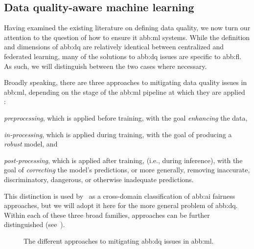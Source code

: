 \subsection{Data quality-aware machine learning}\label{sub:dq:solutions}

Having examined the existing literature on defining data quality,
we now turn our attention to the question of how to ensure it \gls{abb:ml} systems.
While the definition and dimensions of \gls{abb:dq}
are relatively identical between centralized and federated learning,
many of the solutions to \gls{abb:dq} issues are specific to \gls{abb:fl}.
As such, we will distinguish between the two cases where necessary.

Broadly speaking, there are three approaches to mitigating data quality issues in \gls{abb:ml},
depending on the stage of the \gls{abb:ml} pipeline at which they are applied~\cite{%
	mehrabiSurveyBiasFairness2022,%
	whangDataCollectionQuality2023%
}
:
\begin{enumerate*}[label=(\roman*)]
	\item \emph{preprocessing},
	      which is applied before training, with the goal \emph{enhancing} the data,
	\item \emph{in-processing},
	      which is applied during training,
	      with the goal of producing a \emph{robust} model, and
	\item \emph{post-processing},
	      which is applied after training, (i.e., during inference),
	      with the goal of \emph{correcting} the model's predictions, or more generally,
	      removing inaccurate, discriminatory, dangerous, or otherwise inadequate predictions.
\end{enumerate*}
This distinction is used by~\cite{mehrabiSurveyBiasFairness2022,ferraguigSurveyBiasMitigation2021}
as a cross-domain classification of \gls{abb:ai} fairness approaches,
but we will adopt it here for the more general problem of \gls{abb:dq}.
Within each of these three broad families,
approaches can be further distinguished (see~).
\begin{figure}[hbt]
	\begin{center}
	\end{center}
	\caption{The different approaches to mitigating \gls{abb:dq} issues in \gls{abb:ml}.}%
	\label{fig:solutions-taxonomy}
\end{figure}

